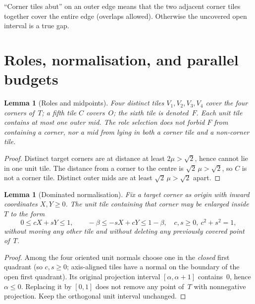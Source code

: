 \documentclass[11pt,reqno]{amsart}
\newtheorem{lemma}[theorem]{Lemma}
\theoremstyle{definition}
\begin{document}
``Corner tiles abut'' on an outer edge means that the two adjacent corner tiles
together cover the entire edge (overlaps allowed).  Otherwise the uncovered
open interval is a true gap.



\section{Roles, normalisation, and parallel budgets}\label{sec:basics}

\begin{lemma}[Roles and midpoints]\label{lem:roles}
Four distinct tiles $V_1,V_2,V_3,V_4$ cover the four corners of~$T$; a fifth
tile $C$ covers~$O$; the sixth tile is denoted~$F$.  Each unit tile contains at
most one outer mid.  The role selection does not forbid $F$ from containing a
corner, nor a mid from lying in both a corner tile and a non-corner tile.
\end{lemma}

\begin{proof}
Distinct target corners are at distance at least $2\mu>\sqrt2$, hence cannot
lie in one unit tile.  The distance from a corner to the centre is
$\sqrt2\,\mu>\sqrt2$, so $C$ is not a corner tile.  Distinct outer mids are at
least $\sqrt2\,\mu>\sqrt2$ apart.
\end{proof}

\begin{lemma}[Dominated normalisation]\label{lem:norm}
Fix a target corner as origin with inward coordinates $X,Y\ge 0$.  The unit
tile containing that corner may be enlarged inside~$T$ to the form
\begin{equation}\label{eq:M2}
0\le cX+sY\le 1,\qquad
-\beta\le -sX+cY\le 1-\beta,
\quad c,s\ge 0,\ c^2+s^2=1,
\end{equation}
without moving any other tile and without deleting any previously covered
point of~$T$.
\end{lemma}

\begin{proof}
Among the four oriented unit normals choose one in the \emph{closed} first
quadrant (so $c,s\ge 0$; axis-aligned tiles have a normal on the boundary of
the open first quadrant).  Its original projection interval
$[\alpha,\alpha+1]$ contains~$0$, hence $\alpha\le 0$.  Replacing it by
$[0,1]$ does not remove any point of~$T$ with nonnegative projection.  Keep
the orthogonal unit interval unchanged.
\end{proof}
\end{document}
